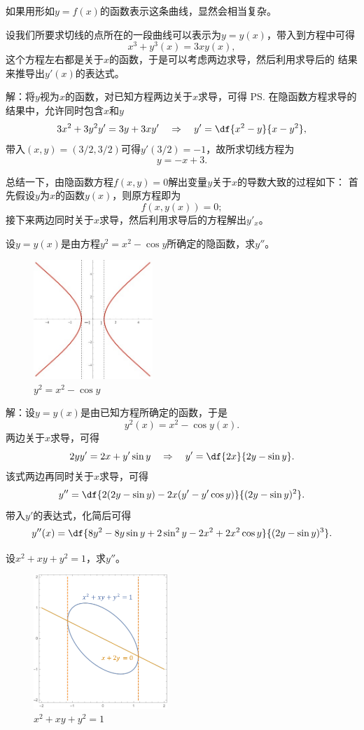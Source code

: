 如果用形如$y=f(x)$的函数表示这条曲线，显然会相当复杂。

设我们所要求切线的点所在的一段曲线可以表示为$y=y(x)$，带入到方程中可得
$$x^3+y^3(x)=3xy(x),$$
这个方程左右都是关于$x$的函数，于是可以考虑两边求导，然后利用求导后的
结果来推导出$y'(x)$的表达式。

解：将$y$视为$x$的函数，对已知方程两边关于$x$求导，可得
\ps{在隐函数方程求导的结果中，允许同时包含$x$和$y$}
$$3x^2+3y^2y'=3y+3xy'\quad\Rightarrow\quad
y'=\df{x^2-y}{x-y^2},$$
带入$(x,y)=(3/2,3/2)$可得$y'(3/2)=-1$，故所求切线方程为
$$y=-x+3.$$
\fin

总结一下，由隐函数方程$f(x,y)=0$解出变量$y$关于$x$的导数大致的过程如下：
首先假设$y$为$x$的函数$y(x)$，则原方程即为
$$f(x,y(x))=0;$$
接下来两边同时关于$x$求导，然后利用求导后的方程解出$y'_x$。

\bs
\egz 设$y=y(x)$是由方程$y^2=x^2-\cos y$所确定的隐函数，求$y''$。

\begin{figure}[h]
	\centering
	\includegraphics[width=0.4\textwidth]
	{./Images/ch02/y2x2-cosy.jpg}
	\caption{$y^2=x^2-\cos y$}
	\label{fig:y2x2-cosy}
\end{figure}

解：设$y=y(x)$是由已知方程所确定的函数，于是
$$y^2(x)=x^2-\cos y(x).$$
两边关于$x$求导，可得
$$2yy'=2x+y'\sin y\quad\Rightarrow\quad
y'=\df{2x}{2y-\sin y}.$$
该式两边再同时关于$x$求导，可得
$$y''=\df{2(2y-\sin y)-2x(y'-y'\cos y)}{(2y-\sin y)^2}.$$
带入$y'$的表达式，化简后可得
$$y''(x)=\df{8y^2-8y\sin y+2\sin^2y-2x^2+2x^2\cos y}
{(2y-\sin y)^3}.$$
\fin

\egz 设$x^2+xy+y^2=1$，求$y''$。

\begin{figure}[h]
	\centering
	\includegraphics[width=0.45\textwidth]
	{./Images/ch02/x2xyy2.pdf}
	\caption{$x^2+xy+y^2=1$}
	\label{fig:x2xyy2}
\end{figure}

